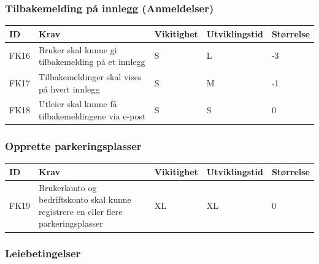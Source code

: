 \documentclass[12pt]{article}
\newcommand{\cellr}{\cellcolor{red!25}}
\newcommand{\cello}{\cellcolor{orange!25}}
\newcommand{\cellg}{\cellcolor{green!25}}
\begin{document}
        \subsubsection{Tilbakemelding på innlegg (Anmeldelser)}
        
        \begin{tabular}{|p{2cm}|p{6cm}|
            >{\centering\arraybackslash}p{2cm}|
            >{\centering\arraybackslash}p{2cm}|
            >{\centering\arraybackslash}p{2cm}|} 
            \hline
            \bf ID & \bf Krav & \bf Vikitighet & \bf Utviklingstid & \bf Størrelse\\
            \hline
            FK16
            &
            Bruker skal kunne gi tilbakemelding på et innlegg
            & S & L & \cellr -3\\
            \hline
            FK17
            &
            Tilbakemeldinger skal vises på hvert innlegg
            & S & M & \cello -1\\
            \hline
            FK18
            &
            Utleier skal kunne få tilbakemeldingene via e-post
            & S & S & \cellg 0\\
            \hline
        \end{tabular}
        
        \subsubsection{Opprette parkeringsplasser}

        \begin{tabular}{|p{2cm}|p{6cm}|
            >{\centering\arraybackslash}p{2cm}|
            >{\centering\arraybackslash}p{2cm}|
            >{\centering\arraybackslash}p{2cm}|} 
            \hline
            \bf ID & \bf Krav & \bf Vikitighet & \bf Utviklingstid & \bf Størrelse\\
            \hline
            FK19
            &
            Brukerkonto og bedriftskonto skal kunne registrere en eller flere parkeringsplasser
            & XL & XL & \cellg 0\\
            \hline
        \end{tabular}

        \subsubsection{Leiebetingelser}
        
\end{document}
